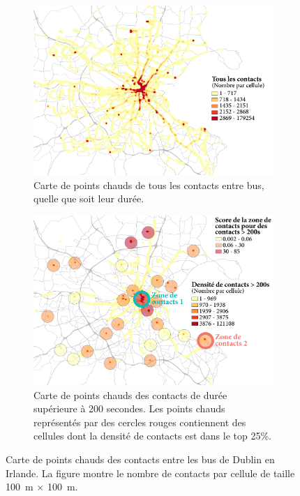 
\begin{figure}[t!] 
\centering 
  \begin{subfigure}[t]{0.45\textwidth} 
    \centering 
    \includegraphics[width=.8\linewidth]{figures-fr/dublin-all-contacts-fr.pdf} 
    \caption{Carte de points chauds de tous les contacts entre bus, quelle que soit leur durée.\vspace{1em}} 
    \label{fig:2d-all-contacts-fr} 
  \end{subfigure}%
 \qquad 
  \begin{subfigure}[t]{.45\textwidth} 
    \centering 
    \includegraphics[width=.8\linewidth]{figures-fr/dublin-200-contacts-res-fr.pdf} 
    \caption{Carte de points chauds des contacts de durée supérieure à 200 secondes. Les points chauds représentés par des cercles rouges contiennent des cellules dont la densité de contacts est dans le top 25\%.} 
    \label{fig:2d-200-contacts-fr} 
  \end{subfigure} 
 \caption{Carte de points chauds des contacts entre les bus de Dublin en Irlande. La figure montre le nombre de contacts par cellule de taille  100~m $\times$ 100~m.} 
 \label{fig:2d-contacts-fr} 
\end{figure} 
 
